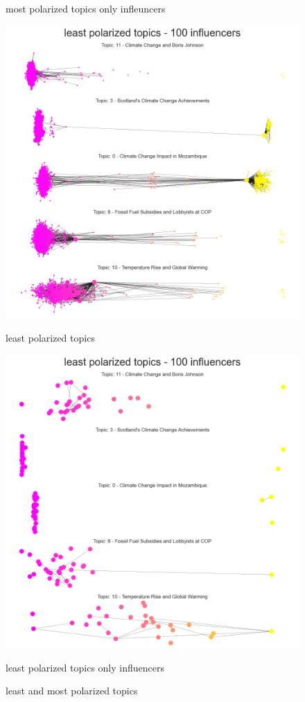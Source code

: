 \begin{figure}[H]
\begin{minipage}{0.50\textwidth}
        \caption{most polarized topics only infleuncers}
    \end{minipage}
    \begin{minipage}{0.50\textwidth}
        \centering
         \includegraphics[width=0.98\linewidth]{Chapter5//figures/least_pol_cop26.png}
        \caption{least polarized topics}
    \end{minipage}\hfill
    \begin{minipage}{0.50\textwidth}
        \centering
         \includegraphics[width=0.98\linewidth]{Chapter5//figures/least_pol_cop26_inf.png}
        \caption{least polarized topics only influencers}
    \end{minipage}

    \caption{least and most polarized topics}
    \label{fig:networks_polarization}
\end{figure}


